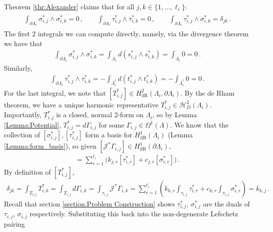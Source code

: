 \documentclass[11pt]{article}
\theoremstyle{plain}
\theoremstyle{definition}
\theoremstyle{remark}
\newcommand{\ST}{\Lambda}
\begin{document}
Theorem \ref{thr:Alexander} claims that for all \( j, k \in \{ 1, \dots, {\ell_i}\} \):
\begin{align*}
    \begin{gathered}
        \int_{\partial \ST_i} \sigma_{i,j}^* \wedge \sigma_{i,k}^* = 
         0 \,,    \qquad 
         \int_{\partial \ST_i} \tau_{i,j}^* \wedge \tau_{i,k}^*
        = 0 \, ,
        \qquad 
         \int_{\partial \ST_i} \tau_{i,j}^* \wedge \sigma_{i,k}^* = \delta_{jk}  \,.
    \end{gathered}
\end{align*}  
The first 2 integrals we can compute directly, namely, via the divergence theorem we have that 
\begin{align*}
    \int_{\partial \ST_i} \sigma_{i,j}^* \wedge \sigma_{i,k}^* = \int_{ \ST_i} d( s_{i,j}^* \wedge s_{i,k}^* ) = \int_{ \ST_i} 0  = 0 \, .
\end{align*}
Similarly,
\begin{align*}
    \int_{\partial \ST_i} \tau_{i,j}^* \wedge \tau_{i,k}^* = - \int_{ \overline{\ST}^c_i} d( t_{i,j}^* \wedge t_{i,k}^* ) = - \int_{ \overline{\ST}^c_i } 0  = 0 \, .
\end{align*}
For the last integral, we note that \([T_{i,j}^*] \in H^2_{\mathrm{dR}} (\ST_i, \partial \ST_i) \). By the de Rham theorem, we have a unique harmonic representative \(T_{i,j}^* \in \mathcal{H}^2_D(\ST_i)\). Importantly, \(T_{i,j}^*\) is a closed, normal 2-form on \(\ST_i\), so by Lemma \ref{Lemma:Potential}, \(T_{i,j}^* = d \Gamma_{i,j} \) for some \(\Gamma_{i,j} \in \Omega^1(\ST)\). We know that the collection of \([\sigma_{i,j}^*], [\tau_{i,j}^*]\) form a basis for \(H^1_{\mathrm{dR}}(\ST_i)\) (Lemma \ref{Lemma:form_basis}), so given \([\mathcal{J}^* \Gamma_{i,j} ] \in H^1_{\mathrm{dR}} (\partial \ST_i)\), 
\begin{align*}
    [\mathcal{J}^* \Gamma_{i,j} ] = \sum_{r=1}^{\ell_i} \Big( k_{j,r} [\tau_{i,r}^*] +   c_{j,r} [\sigma_{i,r}^*] \Big) \, .
\end{align*}
By definition of \([T_{i,j}^*]\),
\begin{align*}
    \delta_{jk}  = \int_{T_{i,j}} T_{i,k}^*
    =   \int_{T_{i,j}} d \Gamma_{i,k} 
    =    \int_{\tau_{i,j}} \mathcal{J}^*  \Gamma_{i,k} 
    =
    \sum_{r=1}^{\ell_i} \left( k_{k,r} \int_{\tau_{i,j}}  \tau_{i,r}^* +  c_{k,r}  \int_{\tau_{i,j}} \sigma_{i,r}^* \right) = k_{k,j}
    \, .
\end{align*}
Recall that section \ref{section:Problem Construction} shows \(\tau_{i,j}^*\), \(\sigma_{i,j}^*\) are the duals of \(\tau_{i,j}\), \(\sigma_{i,j}\) respectively. Substituting this back into the non-degenerate Lefschetz pairing
\end{document}
